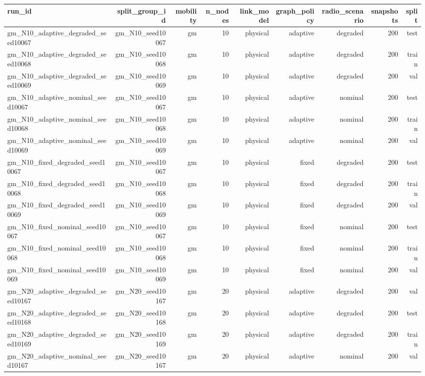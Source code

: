 \begin{tabular}{lrrrrrrrr}
\toprule
run\_id & split\_group\_id & mobility & n\_nodes & link\_model & graph\_policy & radio\_scenario & snapshots & split \\
\midrule
gm\_N10\_adaptive\_degraded\_seed10067 & gm\_N10\_seed10067 & gm & 10 & physical & adaptive & degraded & 200 & test \\
gm\_N10\_adaptive\_degraded\_seed10068 & gm\_N10\_seed10068 & gm & 10 & physical & adaptive & degraded & 200 & train \\
gm\_N10\_adaptive\_degraded\_seed10069 & gm\_N10\_seed10069 & gm & 10 & physical & adaptive & degraded & 200 & val \\
gm\_N10\_adaptive\_nominal\_seed10067 & gm\_N10\_seed10067 & gm & 10 & physical & adaptive & nominal & 200 & test \\
gm\_N10\_adaptive\_nominal\_seed10068 & gm\_N10\_seed10068 & gm & 10 & physical & adaptive & nominal & 200 & train \\
gm\_N10\_adaptive\_nominal\_seed10069 & gm\_N10\_seed10069 & gm & 10 & physical & adaptive & nominal & 200 & val \\
gm\_N10\_fixed\_degraded\_seed10067 & gm\_N10\_seed10067 & gm & 10 & physical & fixed & degraded & 200 & test \\
gm\_N10\_fixed\_degraded\_seed10068 & gm\_N10\_seed10068 & gm & 10 & physical & fixed & degraded & 200 & train \\
gm\_N10\_fixed\_degraded\_seed10069 & gm\_N10\_seed10069 & gm & 10 & physical & fixed & degraded & 200 & val \\
gm\_N10\_fixed\_nominal\_seed10067 & gm\_N10\_seed10067 & gm & 10 & physical & fixed & nominal & 200 & test \\
gm\_N10\_fixed\_nominal\_seed10068 & gm\_N10\_seed10068 & gm & 10 & physical & fixed & nominal & 200 & train \\
gm\_N10\_fixed\_nominal\_seed10069 & gm\_N10\_seed10069 & gm & 10 & physical & fixed & nominal & 200 & val \\
gm\_N20\_adaptive\_degraded\_seed10167 & gm\_N20\_seed10167 & gm & 20 & physical & adaptive & degraded & 200 & val \\
gm\_N20\_adaptive\_degraded\_seed10168 & gm\_N20\_seed10168 & gm & 20 & physical & adaptive & degraded & 200 & test \\
gm\_N20\_adaptive\_degraded\_seed10169 & gm\_N20\_seed10169 & gm & 20 & physical & adaptive & degraded & 200 & train \\
gm\_N20\_adaptive\_nominal\_seed10167 & gm\_N20\_seed10167 & gm & 20 & physical & adaptive & nominal & 200 & val \\

\end{tabular}
